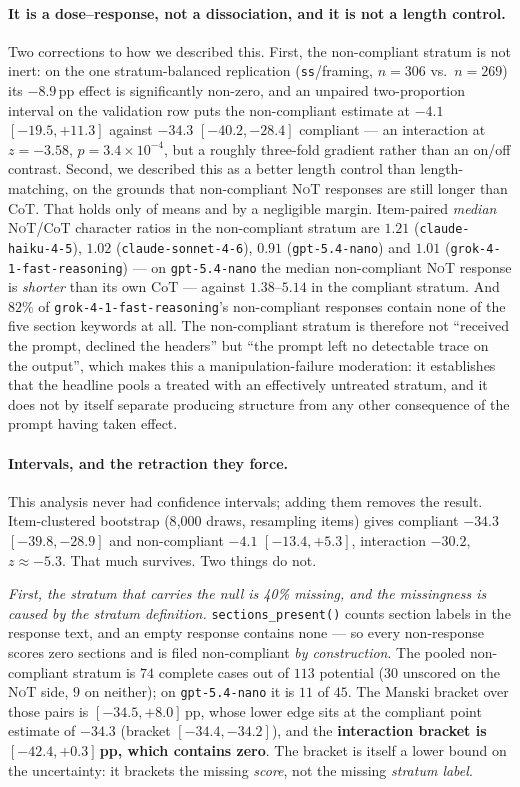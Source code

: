 \documentclass[11pt]{article}
\newcommand{\nano}{\texttt{gpt-5.4-nano}}
\newcommand{\haiku}{\texttt{claude-haiku-4-5}}
\newcommand{\sonnet}{\texttt{claude-sonnet-4-6}}
\newcommand{\grok}{\texttt{grok-4-1-fast-reasoning}}
\newcommand{\NoT}{\textsc{NoT}}
\begin{document}
\paragraph{It is a dose--response, not a dissociation, and it is not a length
control.} Two corrections to how we described this. First, the non-compliant
stratum is not inert: on the one stratum-balanced replication
(\texttt{ss}/framing, $n{=}306$ vs.\ $n{=}269$) its $-8.9$\,pp effect is
significantly non-zero, and an unpaired two-proportion interval on the
validation row puts the non-compliant estimate at $-4.1$ $[-19.5, +11.3]$
against $-34.3$ $[-40.2, -28.4]$ compliant --- an interaction at
$z{=}-3.58$, $p{=}3.4\times10^{-4}$, but a roughly three-fold gradient rather
than an on/off contrast. Second, we described this as a better length control
than length-matching, on the grounds that non-compliant \NoT{} responses are
still longer than CoT. That holds only of means and by a negligible margin.
Item-paired \emph{median} \NoT{}/CoT character ratios in the non-compliant
stratum are $1.21$ (\haiku), $1.02$ (\sonnet), $0.91$ (\nano) and $1.01$
(\grok) --- on \nano{} the median non-compliant \NoT{} response is
\emph{shorter} than its own CoT --- against $1.38$--$5.14$ in the compliant
stratum. And $82\%$ of \grok{}'s non-compliant responses contain none of the
five section keywords at all. The non-compliant stratum is therefore not
``received the prompt, declined the headers'' but ``the prompt left no
detectable trace on the output'', which makes this a manipulation-failure
moderation: it establishes that the headline pools a treated with an
effectively untreated stratum, and it does not by itself separate producing
structure from any other consequence of the prompt having taken effect.

\paragraph{Intervals, and the retraction they force.} This analysis never had
confidence intervals; adding them removes the result. Item-clustered bootstrap
(8{,}000 draws, resampling items) gives compliant $-34.3$ $[-39.8, -28.9]$ and
non-compliant $-4.1$ $[-13.4, +5.3]$, interaction $-30.2$, $z\approx-5.3$. That
much survives. Two things do not.

\emph{First, the stratum that carries the null is 40\% missing, and the missingness
is caused by the stratum definition.} \texttt{sections\_present()} counts section
labels in the response text, and an empty response contains none --- so every
non-response scores zero sections and is filed non-compliant \emph{by
construction}. The pooled non-compliant stratum is $74$ complete cases out of
$113$ potential ($30$ unscored on the \NoT{} side, $9$ on neither); on \nano{} it
is $11$ of $45$. The Manski bracket over those pairs is $[-34.5, +8.0]$\,pp,
whose lower edge sits at the compliant point estimate of $-34.3$ (bracket
$[-34.4, -34.2]$), and the \textbf{interaction bracket is $[-42.4, +0.3]$\,pp,
which contains zero}. The bracket is itself a lower bound on the uncertainty: it
brackets the missing \emph{score}, not the missing \emph{stratum label}.
\end{document}
